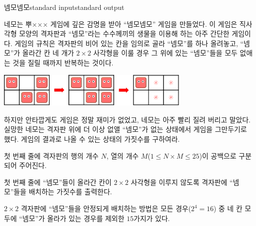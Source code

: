 \begin{problem}{넴모넴모}{standard input}{standard output}

네모는 뿌××× 게임에 깊은 감명을 받아 ``넴모넴모'' 게임을 만들었다. 이 게임은 직사각형 모양의 격자판과 ``넴모''라는 수수께끼의 생물을 이용해 하는 아주 간단한 게임이다. 게임의 규칙은 격자판의 비어 있는 칸을 임의로 골라 ``넴모''를 하나 올려놓고, ``넴모''가 올라간 칸 네 개가 $2 \times 2$ 사각형을 이룰 경우 그 위에 있는 ``넴모''들을 모두 없애는 것을 질릴 때까지 반복하는 것이다.

\begin{center}
  \includegraphics[width=0.7\textwidth]{nemo.png}
\end{center}

하지만 안타깝게도 게임은 정말 재미가 없었고, 네모는 아주 빨리 질려 버리고 말았다. 실망한 네모는 격자판 위에 더 이상 없앨 ``넴모''가 없는 상태에서 게임을 그만두기로 했다. 게임의 결과로 나올 수 있는 상태의 가짓수를 구하여라.

\InputFile
첫 번째 줄에 격자판의 행의 개수 $N$, 열의 개수 $M$($1 \le N \times M \le 25$)이 공백으로 구분되어 주어진다.

\OutputFile
첫 번째 줄에 ``넴모''들이 올라간 칸이 $2 \times 2$ 사각형을 이루지 않도록 격자판에 ``넴모''들을 배치하는 가짓수를 출력한다.

\Example

\begin{example}
%
%
%
\end{example}

\Notes
$2 \times 2$ 격자판에 ``넴모''들을 안정되게 배치하는 방법은 모든 경우($2^{4}=16$) 중 네 칸 모두에 ``넴모''가 올라가 있는 경우를 제외한 $15$가지가 있다.

\end{problem}
